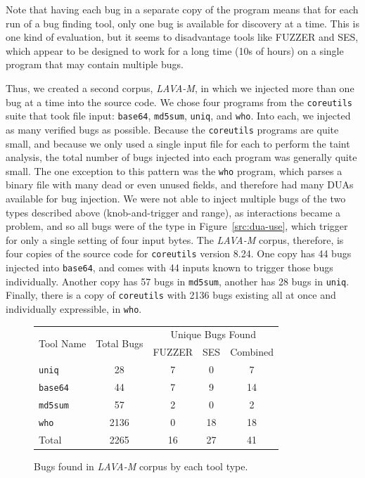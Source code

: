 Note that having each bug in a separate copy of the program means that for each run of a bug finding tool, only one bug is available for discovery at a time.  
This is one kind of evaluation, but it seems to disadvantage tools like FUZZER and SES, which appear to be designed to work for a long time (10s of hours) on a single program that may contain multiple bugs. 

Thus, we created a second corpus, \emph{LAVA-M}, in which we injected more than one bug at a time into the source code.
We chose four programs from the \verb+coreutils+ suite that took file input: \verb+base64+, \verb+md5sum+, \verb+uniq+, and \verb+who+.
Into each, we injected as many verified bugs as possible.
Because the \verb+coreutils+ programs are quite small, and because we only used a single input file for each to perform the taint analysis, the total number of bugs injected into each program was generally quite small.
The one exception to this pattern was the \verb+who+ program, which parses a binary file with many dead or even unused fields, and therefore had many DUAs available for bug injection.
We were not able to inject multiple bugs of the two types described above (knob-and-trigger and range), as interactions became a problem, and so all bugs were of the type in Figure~\ref{src:dua-use}, which trigger for only a single setting of four input bytes.  
The \emph{LAVA-M} corpus, therefore, is four copies of the source code for \verb+coreutils+ version 8.24.
One copy has 44 bugs injected into \verb+base64+, and comes with 44 inputs known to trigger those bugs individually.
Another copy has 57 bugs in \verb+md5sum+, another has 28 bugs in \verb+uniq+.
Finally, there is a copy of \verb+coreutils+ with 2136 bugs existing all at once and individually expressible, in \verb+who+.


\begin{figure}[h]
\centering
\begin{tabular}{l|c|c|c|c} 
\multirow{2}{*}{Tool Name} & \multirow{2}{*}{Total Bugs} & \multicolumn{3}{c}{Unique Bugs Found} \\
              &            & FUZZER       & SES        & Combined \\ \hline 
\verb+uniq+   &    28      & 7            & 0          & 7               \\
\verb+base64+ &    44      & 7            & 9          & 14               \\
\verb+md5sum+ &    57      & 2            & 0          & 2               \\
\verb+who+    &    2136    & 0            & 18         & 18               \\
Total         &    2265    & 16           & 27         & 41               \\
\end{tabular}
\caption{Bugs found in \emph{LAVA-M} corpus by each tool type.}
\label{table:tool-eval-results-coreutils}
\end{figure}

